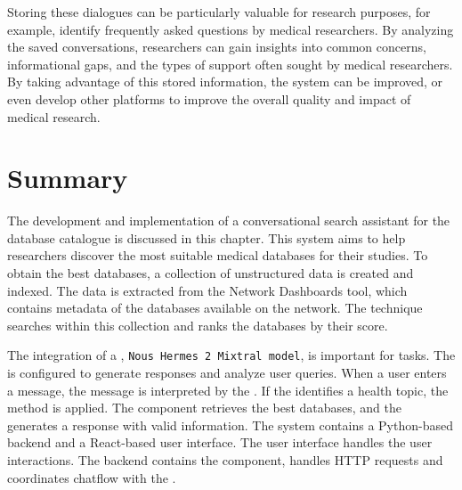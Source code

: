 Storing these dialogues can be particularly valuable for research purposes, for example, identify frequently asked questions by medical researchers. By analyzing the saved conversations, researchers can gain insights into common concerns, informational gaps, and the types of support often sought by medical researchers. By taking advantage of this stored information, the system can be improved, or even develop other platforms to improve the overall quality and impact of medical research.



\section{Summary}

The development and implementation of a conversational search assistant for the {\ehden} database catalogue is discussed in this chapter. This system aims to help researchers discover the most suitable medical databases for their studies. To obtain the best databases, a collection of unstructured data is created and indexed. The data is extracted from the {\ehden} Network Dashboards tool, which contains metadata of the databases available on the {\ehden} network. The {\bm} technique searches within this collection and ranks the databases by their score.

The integration of a {\llm}, \texttt{Nous Hermes 2 Mixtral model}, is important for {\nlp} tasks. The {\llm} is configured to generate responses and analyze user queries. When a user enters a message, the message is interpreted by the {\llm}. If the {\llm} identifies a health topic, the {\rag} method is applied. The {\ir} component retrieves the best databases, and the {\llm} generates a response with valid information. The system contains a Python-based backend and a React-based user interface. The user interface handles the user interactions. The backend contains the {\ir} component, handles HTTP requests and coordinates chatflow with the {\llm}.